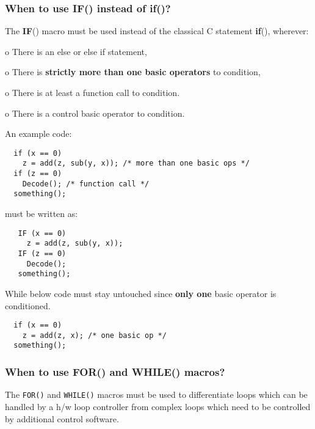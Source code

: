 \subsubsection{When to use IF() instead of if()?}

The \textbf{IF}() macro must be used instead of the classical C
statement \textbf{if}(), wherever:
\begin{list}{}
\item o There is an else or else if statement, \item o There is
\textbf{strictly more than one basic operators} to condition, \item
o There is at least a function call to condition. \item o There is
a control basic operator to condition.
\end{list}
An example code:
{\small
\begin{verbatim}
  if (x == 0)
    z = add(z, sub(y, x)); /* more than one basic ops */
  if (z == 0)
    Decode(); /* function call */
  something();
\end{verbatim}}
must be written as:
{\small
\begin{verbatim}
   IF (x == 0)
     z = add(z, sub(y, x));
   IF (z == 0)
     Decode();
   something();
\end{verbatim}}

While below code must stay untouched since \textbf{only one} basic
operator
is conditioned.
{\small
\begin{verbatim}
  if (x == 0)
    z = add(z, x); /* one basic op */
  something();
\end{verbatim}}

\subsubsection{When to use FOR() and WHILE() macros?} 

The {\tt FOR()} and {\tt WHILE()} macros must be used to differentiate
loops which can be handled by a h/w loop controller from complex loops
which need to be controlled by additional control software.

\flushfloats

